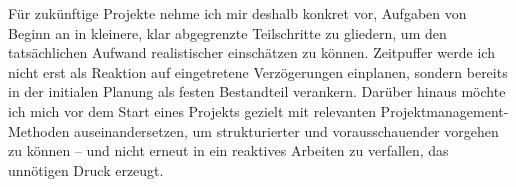 Für zukünftige Projekte nehme ich mir deshalb konkret vor, Aufgaben von Beginn an in kleinere, klar abgegrenzte Teilschritte zu gliedern, um den tatsächlichen Aufwand realistischer einschätzen zu können. Zeitpuffer werde ich nicht erst als Reaktion auf eingetretene Verzögerungen einplanen, sondern bereits in der initialen Planung als festen Bestandteil verankern. Darüber hinaus möchte ich mich vor dem Start eines Projekts gezielt mit relevanten Projektmanagement-Methoden auseinandersetzen, um strukturierter und vorausschauender vorgehen zu können – und nicht erneut in ein reaktives Arbeiten zu verfallen, das unnötigen Druck erzeugt.